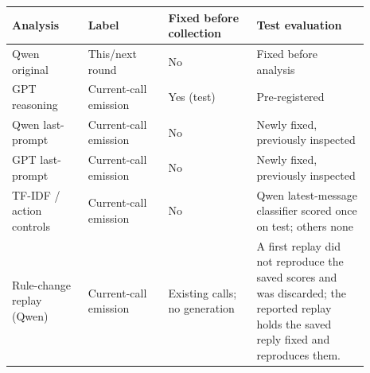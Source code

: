 \begin{tabular}{@{}>{\raggedright\arraybackslash}p{0.19\linewidth}>{\raggedright\arraybackslash}p{0.2\linewidth}>{\raggedright\arraybackslash}p{0.22\linewidth}>{\raggedright\arraybackslash}p{0.28\linewidth}@{}}
\toprule
Analysis & Label & Fixed before collection & Test evaluation \\
\midrule
Qwen original & This/next round & No & Fixed before analysis \\
GPT reasoning & Current-call emission & Yes (test) & Pre-registered \\
Qwen last-prompt & Current-call emission & No & Newly fixed, previously inspected \\
GPT last-prompt & Current-call emission & No & Newly fixed, previously inspected \\
TF-IDF / action controls & Current-call emission & No & Qwen latest-message classifier scored once on test; others none \\
Rule-change replay (Qwen) & Current-call emission & Existing calls; no generation & A first replay did not reproduce the saved scores and was discarded; the reported replay holds the saved reply fixed and reproduces them. \\
\bottomrule
\end{tabular}
